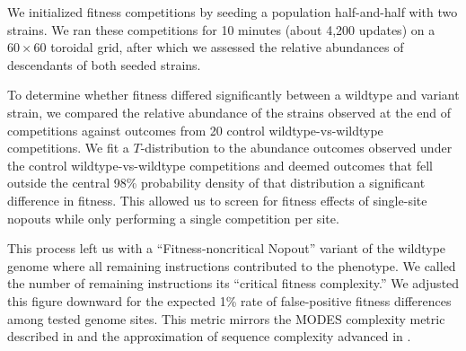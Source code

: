 We initialized fitness competitions by seeding a population half-and-half with two strains.
We ran these competitions for 10 minutes (about 4,200 updates) on a $60\times60$ toroidal grid, after which we assessed the relative abundances of descendants of both seeded strains.

To determine whether fitness differed significantly between a wildtype and variant strain, we compared the relative abundance of the strains observed at the end of competitions against outcomes from 20 control wildtype-vs-wildtype competitions.
We fit a $T$-distribution to the abundance outcomes observed under the control wildtype-vs-wildtype competitions and deemed outcomes that fell outside the central 98\% probability density of that distribution a significant difference in fitness.
This allowed us to screen for fitness effects of single-site nopouts while only performing a single competition per site.

This process left us with a ``Fitness-noncritical Nopout'' variant of the wildtype genome where all remaining instructions contributed to the phenotype.
We called the number of remaining instructions its ``critical fitness complexity.''
We adjusted this figure downward for the expected 1\% rate of false-positive fitness differences among tested genome sites.
This metric mirrors the MODES complexity metric described in \citep{dolson2019modes} and the approximation of sequence complexity advanced in \citep{adami2000evolution}.




